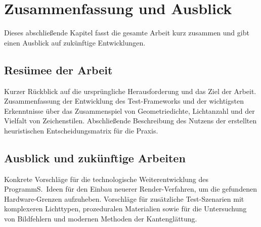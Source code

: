 \chapter{Zusammenfassung und Ausblick}
\label{ch:07_zusammenfassung_ausblick}

Dieses abschließende Kapitel fasst die gesamte Arbeit kurz zusammen und gibt einen Ausblick auf zukünftige Entwicklungen.


\section{Resümee der Arbeit}
\label{sec:0701_resuemee}

Kurzer Rückblick auf die ursprüngliche Herausforderung und das Ziel der Arbeit. Zusammenfassung der Entwicklung des Test-Frameworks und der wichtigsten Erkenntnisse über das Zusammenspiel von Geometriedichte, Lichtanzahl und der Vielfalt von Zeichenstilen. Abschließende Beschreibung des Nutzens der erstellten heuristischen Entscheidungsmatrix für die Praxis.


\section{Ausblick und zukünftige Arbeiten}
\label{sec:0702_future_work}

Konkrete Vorschläge für die technologische Weiterentwicklung des ProgrammS.~Ideen für den Einbau neuerer Render-Verfahren, um die gefundenen Hardware-Grenzen aufzuheben. Vorschläge für zusätzliche Test-Szenarien mit komplexeren Lichttypen, prozeduralen Materialien sowie für die Untersuchung von Bildfehlern und modernen Methoden der Kantenglättung.